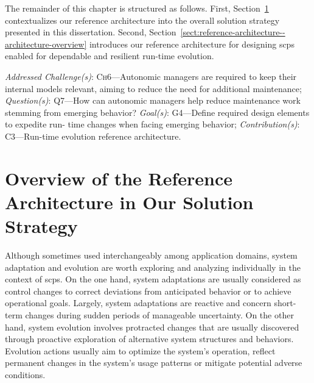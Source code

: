 The remainder of this chapter is structured as follows. First, Section~\ref{sect:reference-architecture--overview-of-architecture-in-solution-strategy} contextualizes our reference architecture into the overall solution strategy presented in this dissertation.  Second, Section~\ref{sect:reference-architecture--architecture-overview} introduces our reference architecture for designing \gls{scps} enabled for dependable and resilient run-time evolution.

\begin{InfoBox}
	\emph{Addressed Challenge(s)}: \textsc{Ch}6---Autonomic managers are required to keep their internal models relevant, aiming to reduce the need for additional maintenance; 
	\emph{Question(s)}: \textsc{Q}7---How can autonomic managers help reduce maintenance work stemming from emerging behavior? 
	\emph{Goal(s)}: \textsc{G}4---Define required design elements to expedite run- time changes when facing emerging behavior; 
	\emph{Contribution(s)}: \textsc{C}3---Run-time evolution reference architecture.
\end{InfoBox}

\section{Overview of the Reference Architecture in Our Solution Strategy}
\label{sect:reference-architecture--overview-of-architecture-in-solution-strategy}

Although sometimes used interchangeably among application domains, system adaptation and evolution are worth exploring and analyzing individually in the context of \gls{scps}. On the one hand, system adaptations are usually considered as control changes to correct deviations from anticipated behavior or to achieve operational goals. Largely, system adaptations are reactive and concern short-term changes during sudden periods of manageable uncertainty. On the other hand, system evolution involves protracted changes that are usually discovered through proactive exploration of alternative system structures and behaviors. Evolution actions usually aim to optimize the system's operation, reflect permanent changes in the system's usage patterns or mitigate potential adverse conditions.

